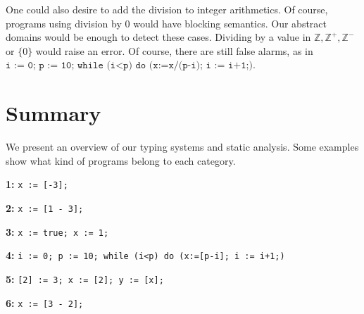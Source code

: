 One could also desire to add the division to integer arithmetics. Of course, programs using division by 0 would have blocking semantics. Our abstract domains would be enough to detect these cases. Dividing by a value in $\mathbb{Z}, \mathbb{Z^+}, \mathbb{Z^-}$ or $\lbrace 0 \rbrace$ would raise an error. Of course, there are still false alarms, as in $\texttt{i := 0; p := 10; while (i<p) do (x:=x/(p-i); i := i+1;)}$.



\section*{Summary}

We present an overview of our typing systems and static analysis. Some examples show what kind of programs belong to each category.

  \begin{center}
  \end{center}

  
  \textbf{1:}
  \texttt{x := [-3];}

  \textbf{2:}
  \texttt{x := [1 - 3];}

  \textbf{3:}
  \texttt{x := true; x := 1;}

  \textbf{4:}
  \texttt{i := 0; p := 10; while (i<p) do (x:=[p-i]; i := i+1;)}

  \textbf{5:}
  \texttt{[2] := 3; x := [2]; y := [x];}

  \textbf{6:}
  \texttt{x := [3 - 2];}
    

